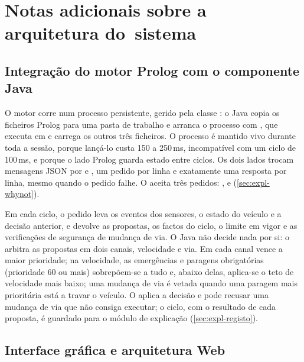 \chapter{Notas adicionais sobre a arquitetura do~sistema}
\label{cap:arquitetura}

\section{Integração do motor Prolog com o componente Java}
\label{sec:integracao}

O motor corre num processo  persistente, gerido pela classe
: o Java copia os ficheiros Prolog para uma pasta de trabalho
e arranca o processo com , que executa
 em  e carrega os outros três ficheiros. O processo é
mantido vivo durante toda a sessão, porque lançá-lo custa 150 a 250\,ms,
incompatível com um ciclo de 100\,ms, e porque o lado Prolog guarda estado entre
ciclos. Os dois lados trocam mensagens JSON por  e , um
pedido por linha e exatamente uma resposta por linha, mesmo quando o pedido
falhe. O  aceita três pedidos: ,  e
 (\cref{sec:expl-whynot}).

Em cada ciclo, o pedido  leva os eventos dos sensores, o estado do
veículo e a decisão anterior, e devolve as propostas, os factos do ciclo, o
limite em vigor e as verificações de segurança de mudança de via. O Java não decide nada por si: o 
arbitra as propostas em dois canais, velocidade e via. Em cada canal vence a
maior prioridade; na velocidade, as emergências e paragens obrigatórias
(prioridade 60 ou mais) sobrepõem-se a tudo e, abaixo delas, aplica-se o teto de
velocidade mais baixo; uma mudança de via é vetada quando uma paragem mais
prioritária está a travar o veículo. O  aplica a decisão
e pode recusar uma mudança de via que não consiga executar; o ciclo, com o
resultado de cada proposta, é guardado para o módulo de explicação
(\cref{sec:expl-registo}).

\section{Interface gráfica e arquitetura Web}
\label{sec:interface}

